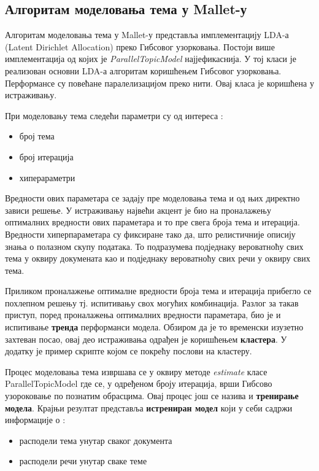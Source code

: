 \subsection{Алгоритам моделовања тема у Mallet-у }

Алгоритам моделовања тема у Mallet-у представља имплементацију LDA-а (Latent Dirichlet Allocation) преко Гибсовог узорковања. Постоји више имплементација од којих је \textit{ParallelTopicModel} најјефикаснија. У тој класи је реализован основни LDA-а алгоритам коришћењем Гибсовог узорковања. Перформансе су повећане паралелизацијом преко нити. Овај класа је коришћена у истраживању.

При моделовању тема следећи параметри су од интереса :

\begin{itemize}
\item број тема
\item број итерација
\item хиперараметри
\end{itemize}

Вредности ових параметара се задају пре моделовања тема и од њих директно зависи решење. 
У истраживању највећи акцент је био на проналажењу оптималних вредности ових параметара и то пре свега броја тема и итерација. Вредности хиперпараметара су фиксиране тако да, што  релистичније описију знања о полазном скупу података. То подразумева подједнаку вероватноћу свих тема у оквиру докумената као и подједнаку вероватноћу свих речи у оквиру свих тема. 

Приликом проналажење оптималне вредности броја тема и итерација прибегло се похлепном решењу тј. испитивању свох могућих комбинација. Разлог за такав приступ, поред проналажења оптималних вредности параметара, био је и испитивање \textbf{тренда} перформанси модела.   Обзиром да је то временски изузетно захтеван посао, овај део истраживања одрађен је коришћењем \textbf{кластера}. У додатку је пример скрипте којом се покрећу послови на кластеру. 

Процес моделовања тема извршава се у оквиру методе \textit{estimate} класе ParallelTopicModel где се, у одређеном броју итерација, врши Гибсово узороковање по познатим обрасцима. Овај процес још се назива и \textbf{тренирање модела}. Крајњи резултат представља \textbf{истрениран модел} који у себи садржи информације о :
\begin{itemize}
\item расподели тема унутар сваког документа
\item расподели речи унутар сваке теме
\end{itemize}


